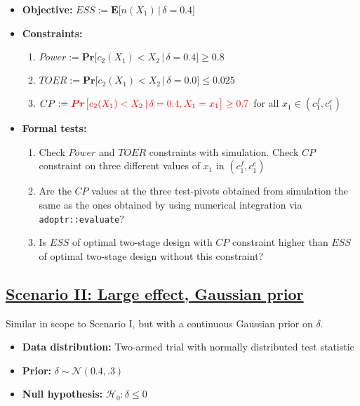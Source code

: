 \documentclass[]{book}
\providecommand{\tightlist}{%
  \setlength{\itemsep}{0pt}\setlength{\parskip}{0pt}}
\begin{document}
\begin{itemize}
\tightlist
\item
  \textbf{Objective:} \(ESS := \boldsymbol{E}\big[n(X_1)\,|\,\delta=0.4\big]\)
\item
  \textbf{Constraints:}

  \begin{enumerate}
  \def\labelenumi{\arabic{enumi}.}
  \tightlist
  \item
    \(Power := \boldsymbol{Pr}\big[c_2(X_1) < X_2\,|\,\delta=0.4\big] \geq 0.8\)
  \item
    \(TOER := \boldsymbol{Pr}\big[c_2(X_1) < X_2\,|\,\delta=0.0\big] \leq 0.025\)
  \item
    \(CP := \color{red}{\boldsymbol{Pr}\big[c_2(X_1) < X_2\,|\,\delta=0.4, X_1 = x_1\big] \geq 0.7}\) for all \(x_1\in(c_1^f, c_1^e)\)
  \end{enumerate}
\item
  \textbf{Formal tests:}

  \begin{enumerate}
  \def\labelenumi{\arabic{enumi}.}
  \tightlist
  \item
    Check \(Power\) and \(TOER\) constraints with simulation.
    Check \(CP\) constraint on three different values of \(x_1\) in
    \((c_1^f, c_1^e)\)
  \item
    Are the \(CP\) values at the three test-pivots obtained from simulation the
    same as the ones obtained by using numerical integration via
    \texttt{adoptr::evaluate}?
  \item
    Is \(ESS\) of optimal two-stage design with \(CP\) constraint higher than
    \(ESS\) of optimal two-stage design without this constraint?
  \end{enumerate}
\end{itemize}

\hypertarget{scenario-ii-large-effect-gaussian-prior}{%
\subsection{\texorpdfstring{\protect\hyperlink{scenarioII}{Scenario II: Large effect, Gaussian prior}}{Scenario II: Large effect, Gaussian prior}}\label{scenario-ii-large-effect-gaussian-prior}}

Similar in scope to Scenario I, but with a continuous Gaussian prior on \(\delta\).

\begin{itemize}
\tightlist
\item
  \textbf{Data distribution:} Two-armed trial with normally distributed test statistic
\item
  \textbf{Prior:} \(\delta\sim\mathcal{N}(0.4, .3)\)
\item
  \textbf{Null hypothesis:} \(\mathcal{H}_0:\delta \leq 0\)
\end{itemize}
\end{document}
